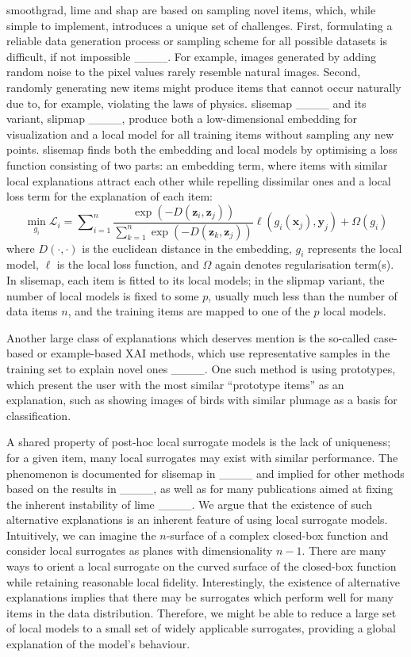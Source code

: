 {\sc smoothgrad}, {\sc lime} and {\sc shap} are based on sampling novel items, which, while simple to implement, introduces a unique set of challenges.
First, formulating a reliable data generation process or sampling scheme for all possible datasets is difficult, if not impossible ____.
For example, images generated by adding random noise to the pixel values rarely resemble natural images.
Second, randomly generating new items might produce items that cannot occur naturally due to, for example, violating the laws of physics.
{\sc slisemap} ____ and its variant, {\sc slipmap} ____, produce both a low-dimensional embedding for visualization and a local model for all training items without sampling any new points.
{\sc slisemap} finds both the embedding and local models by optimising a loss function consisting of two parts: an embedding term, where items with similar local explanations attract each other while repelling dissimilar ones and a local loss term for the explanation of each item:
\begin{equation}
    \min_{g_i} \mathcal{L}_i = \sum\nolimits_{i=1}^n \frac{\exp(-D(\bm{z}_i, \bm{z}_j))}{\sum_{k=1}^n \exp(-D(\bm{z}_k, \bm{z}_j))} \ell(g_i(\bm{x}_j), \bm{y}_j) + \Omega(g_i)
\end{equation}
where $D(\cdot, \cdot)$ is the euclidean distance in the embedding, $g_i$ represents the local model, $\ell$ is the local loss function, and $\Omega$ again denotes regularisation term(s).
In {\sc slisemap}, each item is fitted to its local models; in the {\sc slipmap} variant, the number of local models is fixed to some $p$, usually much less than the number of data items $n$, and the training items are mapped to one of the $p$ local models.

Another large class of explanations which deserves mention is the so-called case-based or example-based XAI methods, which use representative samples in the training set to explain novel ones ____.
One such method is using prototypes, which present the user with the most similar ``prototype items'' as an explanation, such as showing images of birds with similar plumage as a basis for classification. 

A shared property of post-hoc local surrogate models is the lack of uniqueness; for a given item, many local surrogates may exist with similar performance.
The phenomenon is documented for {\sc slisemap} in ____ and implied for other methods based on the results in ____, as well as for many publications aimed at fixing the inherent instability of {\sc lime} ____.
We argue that the existence of such alternative explanations is an inherent feature of using local surrogate models.
Intuitively, we can imagine the $n$-surface of a complex closed-box function and consider local surrogates as planes with dimensionality $n-1$.
There are many ways to orient a local surrogate on the curved surface of the closed-box function while retaining reasonable local fidelity.
Interestingly, the existence of alternative explanations implies that there may be surrogates which perform well for many items in the data distribution.
Therefore, we might be able to reduce a large set of local models to a small set of widely applicable surrogates, providing a global explanation of the model's behaviour.

